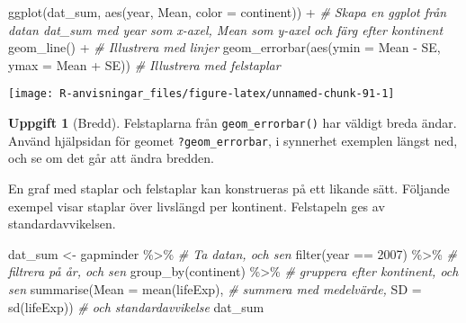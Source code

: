\documentclass[
]{book}
\newenvironment{Shaded}{\begin{snugshade}}{\end{snugshade}}
\newcommand{\AttributeTok}[1]{\textcolor[rgb]{0.77,0.63,0.00}{#1}}
\newcommand{\CommentTok}[1]{\textcolor[rgb]{0.56,0.35,0.01}{\textit{#1}}}
\newcommand{\DecValTok}[1]{\textcolor[rgb]{0.00,0.00,0.81}{#1}}
\newcommand{\FunctionTok}[1]{\textcolor[rgb]{0.00,0.00,0.00}{#1}}
\newcommand{\NormalTok}[1]{#1}
\newcommand{\OtherTok}[1]{\textcolor[rgb]{0.56,0.35,0.01}{#1}}
\newcommand{\SpecialCharTok}[1]{\textcolor[rgb]{0.00,0.00,0.00}{#1}}
\theoremstyle{definition}
\theoremstyle{definition}
\theoremstyle{definition}
\newtheorem{exercise}{Uppgift}[chapter]
\theoremstyle{definition}
\theoremstyle{remark}
\begin{document}
\begin{Shaded}
\begin{Highlighting}[]
\FunctionTok{ggplot}\NormalTok{(dat\_sum, }\FunctionTok{aes}\NormalTok{(year, Mean, }\AttributeTok{color =}\NormalTok{ continent)) }\SpecialCharTok{+}      \CommentTok{\# Skapa en ggplot från datan dat\_sum med year som x{-}axel, Mean som y{-}axel och färg efter kontinent}
  \FunctionTok{geom\_line}\NormalTok{() }\SpecialCharTok{+}                                            \CommentTok{\# Illustrera med linjer}
  \FunctionTok{geom\_errorbar}\NormalTok{(}\FunctionTok{aes}\NormalTok{(}\AttributeTok{ymin =}\NormalTok{ Mean }\SpecialCharTok{{-}}\NormalTok{ SE, }\AttributeTok{ymax =}\NormalTok{ Mean }\SpecialCharTok{+}\NormalTok{ SE))   }\CommentTok{\# Illustrera med felstaplar}
\end{Highlighting}
\end{Shaded}

\begin{center}\texttt{[image: R-anvisningar\_files/figure-latex/unnamed-chunk-91-1]} \end{center}

\begin{exercise}[Bredd]
Felstaplarna från \texttt{geom\_errorbar()} har väldigt breda ändar. Använd hjälpsidan för geomet \texttt{?geom\_errorbar}, i synnerhet exemplen längst ned, och se om det går att ändra bredden.
\end{exercise}

En graf med staplar och felstaplar kan konstrueras på ett likande sätt. Följande exempel visar staplar över livslängd per kontinent. Felstapeln ges av standardavvikelsen.

\begin{Shaded}
\begin{Highlighting}[]
\NormalTok{dat\_sum }\OtherTok{\textless{}{-}}\NormalTok{ gapminder }\SpecialCharTok{\%\textgreater{}\%}                         \CommentTok{\# Ta datan, och sen}
  \FunctionTok{filter}\NormalTok{(year }\SpecialCharTok{==} \DecValTok{2007}\NormalTok{) }\SpecialCharTok{\%\textgreater{}\%}                       \CommentTok{\# filtrera på år, och sen}
  \FunctionTok{group\_by}\NormalTok{(continent) }\SpecialCharTok{\%\textgreater{}\%}                        \CommentTok{\# gruppera efter kontinent, och sen}
  \FunctionTok{summarise}\NormalTok{(}\AttributeTok{Mean =} \FunctionTok{mean}\NormalTok{(lifeExp),                }\CommentTok{\# summera med medelvärde,}
            \AttributeTok{SD =} \FunctionTok{sd}\NormalTok{(lifeExp))                    }\CommentTok{\# och standardavvikelse}
\NormalTok{dat\_sum}
\end{Highlighting}
\end{Shaded}
\end{document}
